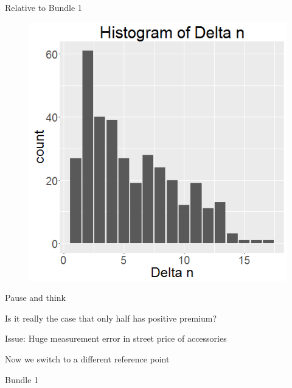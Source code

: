 \documentclass[xcolor=dvipsnames,11pt]{beamer}
\theoremstyle{definition}
\begin{document}
\begin{frame}{Relative to Bundle 1}
\begin{figure}

\graphicspath{ {../../1_relative_to_bundle_1/} }
\includegraphics[scale=0.43]{1_histogram_of_delta_n_rel_to_bundle_1}
\end{figure}
\end{frame}



\begin{frame}{Pause and think}

Is it really the case that only half has positive premium?

\pause
Issue: Huge measurement error in street price of accessories
\pause

Now we switch to a different reference point
\pause

Bundle 1

\end{frame}
\end{document}
